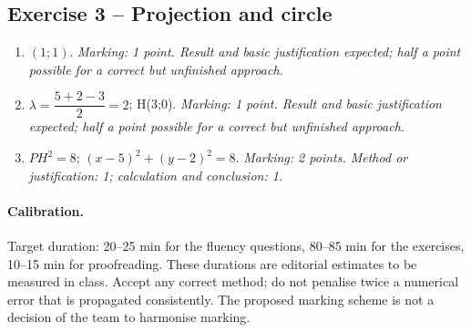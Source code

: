 \subsection*{Exercise 3 -- Projection and circle}
\begin{enumerate}
\item $(1;1)$. \textit{Marking: 1 point. Result and basic justification expected; half a point possible for a correct but unfinished approach.}
\item $\lambda =\dfrac{5+2-3}{2}=2$; H(3;0). \textit{Marking: 1 point. Result and basic justification expected; half a point possible for a correct but unfinished approach.}
\item $PH^2=8$; $(x-5)^2+(y-2)^2=8$. \textit{Marking: 2 points. Method or justification: 1; calculation and conclusion: 1.}
\end{enumerate}
\paragraph{Calibration.} Target duration: 20--25 min for the fluency questions, 80--85 min for the exercises, 10--15 min for proofreading. These durations are editorial estimates to be measured in class. Accept any correct method; do not penalise twice a numerical error that is propagated consistently. The proposed marking scheme is not a decision of the team to harmonise marking.
